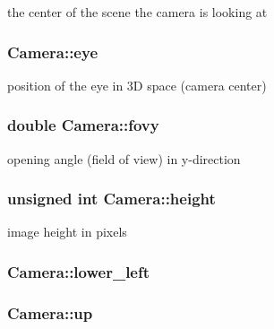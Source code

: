 the center of the scene the camera is looking at 

\subsubsection[{\texorpdfstring{eye}{eye}}]{ Camera\+::eye}\hypertarget{classCamera_a54104afe20129304cdd64d1d2a9ee5f6}{}\label{classCamera_a54104afe20129304cdd64d1d2a9ee5f6}


position of the eye in 3D space (camera center) 

\subsubsection[{\texorpdfstring{fovy}{fovy}}]{\setlength{\rightskip}{0pt plus 5cm}double Camera\+::fovy}\hypertarget{classCamera_a15e5d72f51341a192a09d70447e3fb53}{}\label{classCamera_a15e5d72f51341a192a09d70447e3fb53}


opening angle (field of view) in y-\/direction 

\subsubsection[{\texorpdfstring{height}{height}}]{\setlength{\rightskip}{0pt plus 5cm}unsigned int Camera\+::height}\hypertarget{classCamera_ae9ed166dbbc8876027ecbec9af8761c4}{}\label{classCamera_ae9ed166dbbc8876027ecbec9af8761c4}


image height in pixels 

\subsubsection[{\texorpdfstring{lower\+\_\+left}{lower_left}}]{ Camera\+::lower\+\_\+left\hspace{0.3cm}{\ttfamily [private]}}\hypertarget{classCamera_a7bf1e46dd54906691adf532cc39b664f}{}\label{classCamera_a7bf1e46dd54906691adf532cc39b664f}
\subsubsection[{\texorpdfstring{up}{up}}]{ Camera\+::up}\hypertarget{classCamera_aff4fd1aa62994840f7742b698f15313e}{}\label{classCamera_aff4fd1aa62994840f7742b698f15313e}


